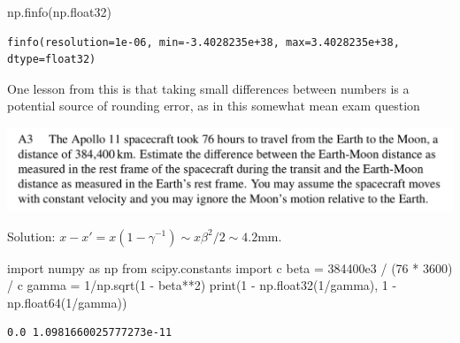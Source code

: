 \documentclass[
  letterpaper,
  DIV=11,
  numbers=noendperiod]{scrreprt}
\newenvironment{Shaded}{\begin{snugshade}}{\end{snugshade}}
\newcommand{\BuiltInTok}[1]{\textcolor[rgb]{0.00,0.23,0.31}{#1}}
\newcommand{\DecValTok}[1]{\textcolor[rgb]{0.68,0.00,0.00}{#1}}
\newcommand{\FloatTok}[1]{\textcolor[rgb]{0.68,0.00,0.00}{#1}}
\newcommand{\ImportTok}[1]{\textcolor[rgb]{0.00,0.46,0.62}{#1}}
\newcommand{\NormalTok}[1]{\textcolor[rgb]{0.00,0.23,0.31}{#1}}
\newcommand{\OperatorTok}[1]{\textcolor[rgb]{0.37,0.37,0.37}{#1}}
\theoremstyle{definition}
\theoremstyle{remark}
\begin{document}
\begin{Shaded}
\begin{Highlighting}[]
\NormalTok{np.finfo(np.float32)}
\end{Highlighting}
\end{Shaded}

\begin{verbatim}
finfo(resolution=1e-06, min=-3.4028235e+38, max=3.4028235e+38, dtype=float32)
\end{verbatim}

One lesson from this is that taking small differences between numbers is
a potential source of rounding error, as in this somewhat mean exam
question

\includegraphics{./assets/ia-question.png}

\begin{tcolorbox}[enhanced jigsaw, bottomrule=.15mm, arc=.35mm, titlerule=0mm, breakable, coltitle=black, leftrule=.75mm, opacitybacktitle=0.6, colbacktitle=quarto-callout-tip-color!10!white, rightrule=.15mm, bottomtitle=1mm, toptitle=1mm, left=2mm, opacityback=0, toprule=.15mm, title=\textcolor{quarto-callout-tip-color}{\faLightbulb}\hspace{0.5em}{Solution}, colback=white, colframe=quarto-callout-tip-color-frame]

Solution: \(x-x'=x(1-\gamma^{-1})\sim x\beta^2/2\sim 4.2\text{mm}\).

\begin{Shaded}
\begin{Highlighting}[]
\ImportTok{import}\NormalTok{ numpy }\ImportTok{as}\NormalTok{ np}
\ImportTok{from}\NormalTok{ scipy.constants }\ImportTok{import}\NormalTok{ c}
\NormalTok{beta }\OperatorTok{=} \FloatTok{384400e3} \OperatorTok{/}\NormalTok{ (}\DecValTok{76} \OperatorTok{*} \DecValTok{3600}\NormalTok{) }\OperatorTok{/}\NormalTok{ c}
\NormalTok{gamma }\OperatorTok{=} \DecValTok{1}\OperatorTok{/}\NormalTok{np.sqrt(}\DecValTok{1} \OperatorTok{{-}}\NormalTok{ beta}\OperatorTok{**}\DecValTok{2}\NormalTok{)}
\BuiltInTok{print}\NormalTok{(}\DecValTok{1} \OperatorTok{{-}}\NormalTok{ np.float32(}\DecValTok{1}\OperatorTok{/}\NormalTok{gamma), }\DecValTok{1} \OperatorTok{{-}}\NormalTok{ np.float64(}\DecValTok{1}\OperatorTok{/}\NormalTok{gamma))}
\end{Highlighting}
\end{Shaded}

\begin{verbatim}
0.0 1.0981660025777273e-11
\end{verbatim}

\end{tcolorbox}
\end{document}

